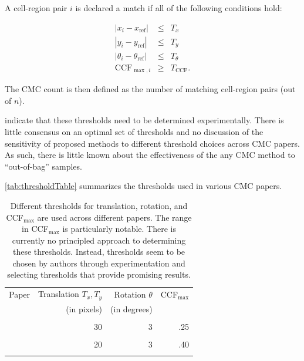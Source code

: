 A cell-region pair \(i\) is declared a match if all of the following
conditions hold:

\begin{eqnarray}\label{eq:original}
|x_i - x_{\text{ref}}| &\leq& T_{x} \\ \nonumber
|y_i - y_{\text{ref}}| &\leq& T_{y} \\ \nonumber
|\theta_i - \theta_{\text{ref}}| &\leq& T_{\theta} \\ \nonumber
\text{CCF}_{\max,i} &\geq& T_{\text{CCF}}.
\end{eqnarray}

The CMC count is then defined as the number of matching cell-region
pairs (out of \(n\)).

\citet{song_3d_2014} indicate that these thresholds need to be
determined experimentally. There is little consensus on an optimal set
of thresholds and no discussion of the sensitivity of proposed methods
to different threshold choices across CMC papers. As such, there is
little known about the effectiveness of the any CMC method to
``out-of-bag'' samples.

\autoref{tab:thresholdTable} summarizes the thresholds used in various
CMC papers.

\begin{table}[ht]
    \centering
    \begin{tabular}{|lrrr|}
      \hline
        Paper & Translation $T_x, T_y$ & Rotation $\theta$ & CCF$_{\max}$ \\
              & (in pixels) & (in degrees) \\
        \hline
        \cellcolor{lightgray}{\citet{song_3d_2014}} & \cellcolor{lightgray}{20} & 
        \cellcolor{lightgray}{6} & \cellcolor{lightgray}{.60} \\
        
        \citet{tong_fired_2014} & 30 & 3 & .25 \\
        
        \cellcolor{lightgray}{\citet{tong_improved_2015}} & \cellcolor{lightgray}{15} & 
        \cellcolor{lightgray}{3} & \cellcolor{lightgray}{.55} \\
        
        \citet{chen_convergence_2017} & 20 & 3 & .40 \\
        
        \cellcolor{lightgray}{\citet{song_estimating_2018}} & \cellcolor{lightgray}{20} & 
        \cellcolor{lightgray}{6} & \cellcolor{lightgray}{.50}\\
        \hline
    \end{tabular}
    \caption{Different thresholds for translation, rotation, and CCF$_{\max}$ are used across different papers. The range in CCF$_{\max}$ is particularly notable. There is currently no principled approach to determining these thresholds. Instead, thresholds seem to be chosen by authors through experimentation and selecting thresholds that provide promising results.}
    \label{tab:thresholdTable}
\end{table}

